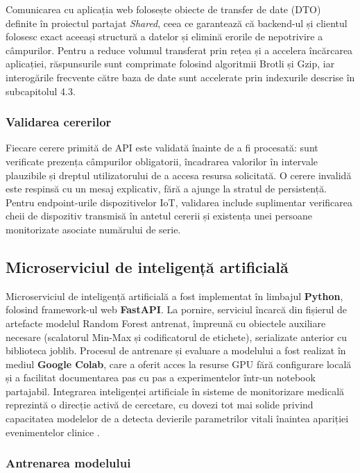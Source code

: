 \documentclass[12pt,a4paper,twoside]{article}
\begin{document}
Comunicarea cu aplicația web folosește obiecte de transfer de date (DTO) definite în proiectul partajat \textit{Shared}, ceea ce garantează că backend-ul și clientul folosesc exact aceeași structură a datelor și elimină erorile de nepotrivire a câmpurilor. Pentru a reduce volumul transferat prin rețea și a accelera încărcarea aplicației, răspunsurile sunt comprimate folosind algoritmii Brotli și Gzip, iar interogările frecvente către baza de date sunt accelerate prin indexurile descrise în subcapitolul 4.3.

\subsubsection{Validarea cererilor}

Fiecare cerere primită de API este validată înainte de a fi procesată: sunt verificate prezența câmpurilor obligatorii, încadrarea valorilor în intervale plauzibile și dreptul utilizatorului de a accesa resursa solicitată. O cerere invalidă este respinsă cu un mesaj explicativ, fără a ajunge la stratul de persistență. Pentru endpoint-urile dispozitivelor IoT, validarea include suplimentar verificarea cheii de dispozitiv transmisă în antetul cererii și existența unei persoane monitorizate asociate numărului de serie.


\subsection{Microserviciul de inteligență artificială}

Microserviciul de inteligență artificială a fost implementat în limbajul \textbf{Python}, folosind framework-ul web \textbf{FastAPI}. La pornire, serviciul încarcă din fișierul de artefacte modelul Random Forest antrenat, împreună cu obiectele auxiliare necesare (scalatorul Min-Max și codificatorul de etichete), serializate anterior cu biblioteca joblib. Procesul de antrenare și evaluare a modelului a fost realizat în mediul \textbf{Google Colab}, care a oferit acces la resurse GPU fără configurare locală și a facilitat documentarea pas cu pas a experimentelor într-un notebook partajabil. Integrarea inteligenței artificiale în sisteme de monitorizare medicală reprezintă o direcție activă de cercetare, cu dovezi tot mai solide privind capacitatea modelelor de a detecta devierile parametrilor vitali înaintea apariției evenimentelor clinice \cite{maswadi2026, panteli2025, panahi2025future}.

\subsubsection{Antrenarea modelului}
\end{document}
